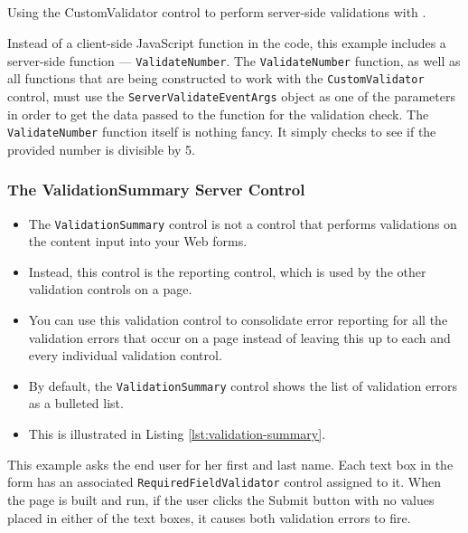 \subparagraph*{{\cs}}
Using the CustomValidator control to perform server-side validations with \cs.


Instead of a client-side JavaScript function in the code, this example includes a server-side function — \texttt{ValidateNumber}. The \texttt{ValidateNumber} function, as well as all functions that are being constructed to
work with the \texttt{CustomValidator} control, must use the \texttt{ServerValidateEventArgs} object as one of the
parameters in order to get the data passed to the function for the validation check. The \texttt{ValidateNumber}
function itself is nothing fancy. It simply checks to see if the provided number is divisible by 5.

\subsubsection{The ValidationSummary Server Control}
\begin{itemize}
	\item The \texttt{ValidationSummary} control is not a control that performs validations on the content input into your Web forms. 
	\item Instead, this control is the reporting control, which is used by the other validation controls on a page. 
	\item You can use this validation control to consolidate error reporting for all the validation errors
	that occur on a page instead of leaving this up to each and every individual validation control.
	\item By default, the \texttt{ValidationSummary} control shows the list of validation errors as a bulleted list. 
	\item This is illustrated in Listing {\ref{lst:validation-summary}}.
\end{itemize}



This example asks the end user for her first and last name. Each text box in the form has an associated
\texttt{RequiredFieldValidator} control assigned to it. When the page is built and run, if the user clicks the
Submit button with no values placed in either of the text boxes, it causes both validation errors to fire.

